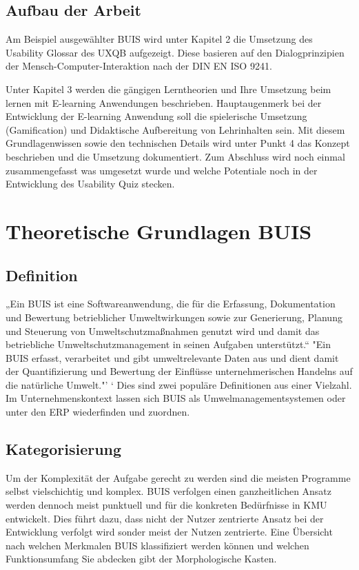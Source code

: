 \documentclass[a4paper, 12pt, twoside, BCOR=20mm, DIV=calc, abstracton, parskip=half*, toc=bibliography, toc=listof, headsepline, footsepline, headings=small, numbers=enddot]{scrreprt}
\begin{document}
	\section{Aufbau der Arbeit}
	Am Beispiel ausgewählter \ac{BUIS} wird unter Kapitel 2 die Umsetzung des Usability Glossar des \ac{UXQB} aufgezeigt. Diese basieren auf den Dialogprinzipien der Mensch-Computer-Interaktion nach der DIN EN ISO 9241\cite{cpux-f}.  
	
	Unter Kapitel 3 werden die gängigen Lerntheorien und Ihre Umsetzung beim lernen mit E-learning Anwendungen beschrieben. Hauptaugenmerk bei der Entwicklung der E-learning Anwendung soll die spielerische Umsetzung (Gamification) und Didaktische Aufbereitung von Lehrinhalten sein. 
	Mit diesem Grundlagenwissen sowie den technischen Details wird unter Punkt 4 das Konzept beschrieben und die Umsetzung dokumentiert. Zum Abschluss wird noch einmal zusammengefasst was umgesetzt wurde und welche Potentiale noch in der Entwicklung des Usability Quiz stecken. 
	
	\chapter{Theoretische Grundlagen BUIS}
	\section{Definition}
	„Ein \ac{BUIS} %
	ist eine Softwareanwendung, die für die Erfassung, Dokumentation und Bewertung betrieblicher Umweltwirkungen sowie  zur Generierung, Planung und Steuerung von Umweltschutzmaßnahmen genutzt wird und damit das betriebliche Umweltschutzmanagement in seinen Aufgaben unterstützt.“ \cite{wohlgemuth2008konzepte}
	"Ein BUIS erfasst, verarbeitet und gibt umweltrelevante Daten aus und dient damit der Quantifizierung und Bewertung der Einflüsse unternehmerischen Handelns auf die natürliche Umwelt."'\cite{Wiki_BUIS} `
	Dies sind zwei populäre Definitionen aus einer Vielzahl. Im Unternehmenskontext lassen sich \ac{BUIS} als Umwelmanagementsystemen  oder unter den \acs{ERP} wiederfinden und zuordnen.  
	
	\section{Kategorisierung}
	Um der Komplexität der Aufgabe gerecht zu werden sind die meisten Programme selbst vielschichtig und komplex. \ac{BUIS} verfolgen einen ganzheitlichen Ansatz werden dennoch meist punktuell und für die konkreten Bedürfnisse in \ac{KMU} entwickelt. Dies führt dazu, dass nicht der Nutzer zentrierte Ansatz bei der Entwicklung verfolgt wird sonder meist der Nutzen zentrierte.  
	Eine Übersicht nach welchen Merkmalen \ac{BUIS} klassifiziert werden können und welchen Funktionsumfang Sie abdecken gibt der Morphologische Kasten.
	
\end{document}
